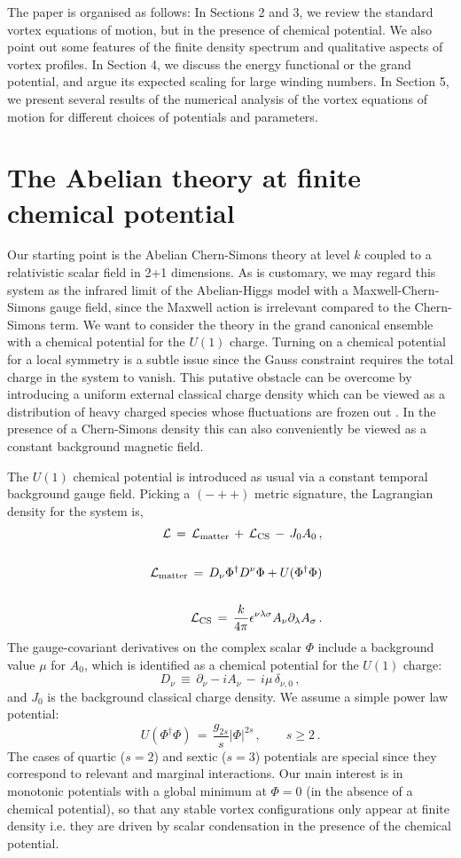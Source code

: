 \documentclass[12pt,a4paper]{article}
\def\be{\begin{equation}}
\def\ee{\end{equation}}
\newcommand{\bea}{\begin{eqnarray}}
\newcommand{\eea}{\end{eqnarray}}
\begin{document}
The paper is organised as follows: In Sections 2 and 3, we review the  standard vortex equations of motion, but in the presence of chemical potential. We also point out some features of the finite density spectrum and qualitative aspects of vortex profiles.  In Section 4, we discuss the energy functional or the grand potential, and argue its expected scaling for large winding numbers. In Section 5, we present several results of the numerical analysis of the vortex equations of motion for different choices of potentials and parameters.
\section{The Abelian theory at finite chemical potential}
Our starting point is the Abelian Chern-Simons theory at level $k$ coupled to a relativistic scalar field in 2+1 dimensions. As is customary, we may regard this system as the  infrared limit of the Abelian-Higgs model with a Maxwell-Chern-Simons gauge field, since the Maxwell action is irrelevant compared to the Chern-Simons term. We want to consider the theory in the grand canonical ensemble with a chemical potential for the $U(1)$ charge. Turning on a chemical potential for a local symmetry is a subtle issue since the Gauss constraint requires the total charge in the system to vanish. This putative obstacle can be overcome by introducing  a uniform external classical charge density which can be viewed  as a distribution of  heavy charged species whose fluctuations are frozen out \cite{Kapusta:1981aa, Rosen:2010es}. In the presence of a Chern-Simons density this can also conveniently be viewed as a constant background magnetic field.

The $U(1)$ chemical potential is introduced as usual via a constant temporal background gauge field. Picking a $(-++)$ metric signature, the Lagrangian density for the system is, 
\bea
&&\mathcal{L} \,=\,\mathcal{L}_{\rm matter} \,+\,\mathcal{L}_{\rm CS}\, -\, J_0 A_0\,,
\\\nonumber\\\nonumber
&&\mathcal{L}_{\rm matter} \,=\, D_{\nu}\Phi^\dagger D^{\nu}\Phi + U(\Phi^\dagger\Phi) 
 \\\nonumber\\\nonumber
&&\mathcal{L}_{\rm CS} \,= \,\frac{k}{4 \pi} \epsilon^{\nu \lambda\sigma}
A_{\nu} \partial_{\lambda} A_{\sigma}\,.
\eea
The gauge-covariant derivatives on the complex scalar $\Phi$ include a background value $\mu$ for $A_0$, which is identified as a chemical potential for the $U(1)$ charge:
\be
D_{\nu}\, \equiv\, \partial_{\nu} -i A_{\nu}\,-\,i\mu\,\delta_{\nu,0}\,,
\ee
and $J_0$ is the background  classical charge density.  We assume  a  simple power law potential:
\be
U(\Phi^\dagger \Phi) \,=\, \frac{g_{2s}}{s} |\Phi|^{2s}\,, \qquad s \geq  2\,.
 \ee
 The cases of quartic ($s=2$) and sextic ($s=3$) potentials are special since they correspond to relevant and marginal interactions. Our main interest is in monotonic potentials with a global minimum at $\Phi=0$ (in the absence of a chemical potential), so that any stable vortex configurations only appear at finite density  i.e. they are driven by scalar condensation in the presence of the chemical potential. 
 
\end{document}
